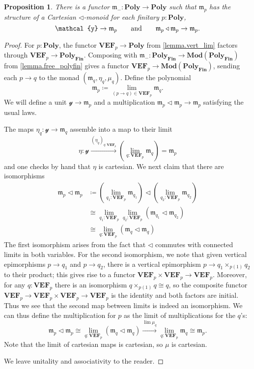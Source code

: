 \documentclass[11pt, one side, article]{memoir}
\theoremstyle{definition}
\theoremstyle{plain}
\newtheorem{proposition}[definitionx]{Proposition}
\newcommand{\Cat}[1]{\mathbf{#1}}%
\newcommand{\To}[2][]{\xrightarrow[#1]{#2}}
\newcommand{\finset}{\Cat{Fin}}
\newcommand{\polyfin}{\poly_{\finset}}
\newcommand{\Mod}{\Cat{Mod}}
\newcommand{\yon}{\mathcal{y}}
\newcommand{\poly}{\Cat{Poly}}
\newcommand{\tri}{\mathbin{\triangleleft}}
\newcommand{\free}{\mathfrak{m}}
\newcommand{\VEF}{\Cat{VEF}}
\newcommand{\qqand}{\qquad\text{and}\qquad}
\begin{document}
\begin{proposition}
There is a functor $\free_-\colon\poly\to\poly$ such that $\free_p$ has the structure of a Cartesian $\tri$-monoid for each finitary $p:\poly$,
\[
\yon\to\free_p
\qqand
\free_p\tri\free_p\to\free_p.
\qedhere
\]
\end{proposition}
\begin{proof}
For $p:\poly$, the functor $\VEF_p\to\poly$ from \cref{lemma.vert_lim} factors through $\VEF_p\to\polyfin$. Composing with $\free_-\colon\polyfin\to\Mod(\polyfin)$ from \cref{lemma.free_polyfin} gives a functor $\VEF_p\to\Mod(\polyfin)$,
sending each $p\to q$ to the monad $(\free_q,\eta_q,\mu_q)$. Define the polynomial
\[\free_p\coloneqq\lim_{(p\to q)\in\VEF_p}\free_q.\]
We will define a unit $\yon\to\free_p$ and a multiplication $\free_p\tri\free_p\to\free_p$ satisfying the usual laws. 

The maps $\eta_q\colon\yon\to\free_q$ assemble into a map to their limit
\[
  \eta\colon\yon\To{(\eta_q)_{q:\VEF_p}}
  \left(\lim_{q:\VEF_p}\free_q\right)=
  \free_p
\]
and one checks by hand that $\eta$ is cartesian. We next claim that there are isomorphisms
\begin{align*}
	\free_p\tri\free_p&\coloneqq
  \left(\lim_{q_1:\VEF_p}\free_{q_1}\right)\tri\left(\lim_{q_2:\VEF_p}\free_{q_2}\right)\\&\cong
  \lim_{q_1:\VEF_p}\lim_{q_2:\VEF_p}(\free_{q_1}\tri\free_{q_2})\\&\cong
  \lim_{q:\VEF_p}(\free_q\tri\free_q)
\end{align*}
The first isomorphism arises from the fact that $\tri$ commutes with connected limits in both variables. For the second isomorphism, we note that given vertical epimorphisms $p\to q_1$ and $p\to q_2$, there is a vertical epimorphism $p\to q_1\times_{p(1)}q_2$ to their product; this gives rise to a functor $\VEF_p\times\VEF_p\to\VEF_p$. Moreover, for any $q:\VEF_p$ there is an isomorphism $q\times_{p(1)}q\cong q$, so the composite functor $\VEF_p\to\VEF_p\times\VEF_p\to\VEF_p$ is the identity and both factors are initial. Thus we see that the second map between limits is indeed an isomorphism. We can thus define the multiplication for $p$ as the limit of multiplications for the $q$'s:
\[
\free_p\tri\free_p\cong\lim_{q:\VEF_p}(\free_q\tri\free_q)\To{\lim\mu_q}\lim_{q:\VEF_p}\free_q\cong \free_p.
\]
Note that the limit of cartesian maps is cartesian, so $\mu$ is cartesian.

We leave unitality and associativity to the reader.
\end{proof}
\end{document}
